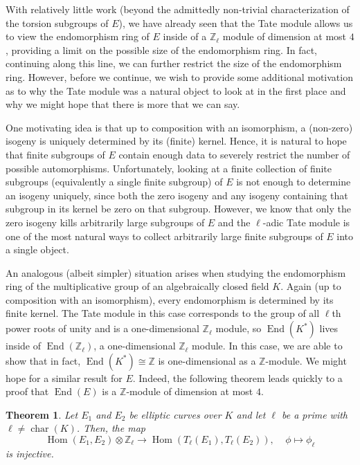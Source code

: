 \documentclass{amsart}
\newtheorem{thm}{Theorem}[section]
\theoremstyle{definition}
\theoremstyle{remark}
\numberwithin{equation}{section}
\newcommand{\bbZ}{\mathbb Z}
\DeclareMathOperator{\Char}{char}
\DeclareMathOperator{\End}{End}
\DeclareMathOperator{\Hom}{Hom}
\begin{document}
With relatively little work (beyond the admittedly non-trivial characterization of the torsion subgroups of $E$), we have already seen that the Tate module allows us to view the endomorphism ring of $E$ inside of a $\bbZ_{\ell}$ module of dimension at most $4$, providing a limit on the possible size of the endomorphism ring. In fact, continuing along this line, we can further restrict the size of the endomorphism ring.
However, before we continue, we wish to provide some additional motivation as to why the Tate module was a natural object to look at in the first place and why we might hope that there is more that we can say.

 One motivating idea is that up to composition with an isomorphism, a (non-zero) isogeny is uniquely determined by its (finite) kernel. Hence, it is natural to hope that finite subgroups of $E$ contain enough data to severely restrict the number of possible automorphisms. Unfortunately, looking at a finite collection of finite subgroups (equivalently a single finite subgroup) of $E$ is not enough to determine an isogeny uniquely, since both the zero isogeny and any isogeny containing that subgroup in its kernel be zero on that subgroup. However, we know that only the zero isogeny kills arbitrarily large subgroups of $E$ and the $\ell$-adic Tate module is one of the most natural ways to collect arbitrarily large finite subgroups of $E$ into a single object.

 An analogous (albeit simpler) situation arises when studying the endomorphism ring of the multiplicative group of an algebraically closed field $K$. Again (up to composition with an isomorphism), every endomorphism is determined by its finite kernel. The Tate module in this case corresponds to the group of all $\ell$th power roots of unity and is a one-dimensional $\bbZ_{\ell}$ module, so $\End(K^*)$ lives inside of $\End(\bbZ_{\ell})$, a one-dimensional $\bbZ_{\ell}$ module. In this case, we are able to show that in fact, $\End(K^*) \cong \bbZ$ is one-dimensional as a $\bbZ$-module. We might hope for a similar result for $E$. Indeed, the following theorem leads quickly to a proof that $\End(E)$ is a $\bbZ$-module of dimension at most $4$.
 
\begin{thm} \label{thm:TensorProductIntoTateModule}
Let $E_{1}$ and $E_{2}$ be elliptic curves over $K$ and let $\ell$ be a prime with $\ell \neq \Char(K)$. Then, the map
\[
\Hom(E_{1}, E_{2}) \otimes \bbZ_{\ell} \to \Hom(T_{\ell}(E_{1}), T_{\ell}(E_{2})), 
\ \ \ \ \ 
\phi \mapsto \phi_{\ell}
\]
is injective.
\end{thm}
\end{document}
